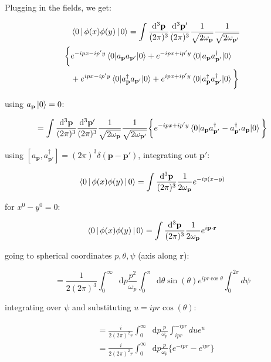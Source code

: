 \documentclass[aspectratio=169]{beamer}
\newcommand{\vp}{\mathbf{p}}
\newcommand{\vr}{\mathbf{r}}
\newcommand{\vpp}{\mathbf{p}'}
\newcommand{\omp}{\omega_{p}}
\newcommand{\omvp}{\omega_{\vp}}
\newcommand{\omvpp}{\omega_{\vpp}}
\newcommand{\ap}{a_{\vp}}
\newcommand{\app}{a_{\vpp}}
\newcommand{\adp}{a^\dagger_{\vp}}
\newcommand{\adpp}{a^\dagger_{\vpp}}
\newcommand{\diffop}{\mathop{}\!\mathrm{d}}
\newcommand{\dip}{\diffop p}
\newcommand{\dtheta}{\diffop \theta}
\newcommand{\bysqrt}[1]{\frac{1}{\sqrt{#1}}}
\newcommand{\intpthree}{\int \frac{\diffop^3\vp}{(2\pi)^3}}
\newcommand{\intpthreeppthree}{\int \frac{\diffop^3\vp}{(2\pi)^3} \frac{\diffop^3\vpp}{(2\pi)^3}}
\newcommand{\com}[2]{[{#1},{#2}]}
\newcommand{\phixy}{\Braket{0|\phi(x)\phi(y)|0}}
\begin{document}
\begin{frame}
Plugging in the fields, we get:

\begin{equation*}
\begin{split}
& \phixy = \intpthreeppthree \bysqrt{2\omvp} \bysqrt{2\omvpp} \\
\bigg\{ & e^{-ipx-ip'y} \braket{0|\ap\app|0} + e^{-ipx+ip'y} \braket{0|\ap\adpp|0} \\
        & + e^{ipx-ip'y} \braket{0|\adp\app|0} + e^{ipx+ip'y} \braket{0|\adp\adpp|0} \bigg\}
\end{split}
\end{equation*}

using $\ap\ket{0} = 0$:

\begin{equation*}
= \intpthreeppthree \bysqrt{2\omvp} \bysqrt{2\omvpp}
\bigg\{ e^{-ipx+ip'y} \braket{0|\ap\adpp - \adpp\ap|0} \bigg\}
\end{equation*}
\end{frame}


\begin{frame}
using $\com{\ap}{\adpp} = (2\pi)^3 \delta(\vp - \vpp)$, integrating out $\vpp$:

\begin{equation*}
\phixy = \intpthree \frac{1}{2\omvp} e^{-ip(x-y)}
\end{equation*}

for $x^0 - y^0 = 0$:

\begin{equation*}
\phixy = \intpthree \frac{1}{2\omvp} e^{i\vp\cdot\vr}
\end{equation*}
\end{frame}


\begin{frame}
going to spherical coordinates $p, \theta, \psi$ (axis along $\vr$):

\begin{equation*}
= \frac{1}{2(2\pi)^3} \int_0^\infty \dip \frac{p^2}{\omp} \int_0^\pi \dtheta \sin(\theta) e^{ipr\cos{\theta}}
\int_0^{2\pi} d\psi
\end{equation*}

integrating over $\psi$ and substituting $u = ipr\cos(\theta)$:

\begin{equation*}
\begin{split}
& = \frac{i}{2(2\pi)^2 r} \int_0^\infty \dip \frac{p}{\omp} \int_{ipr}^{-ipr} du e^{u} \\
& = \frac{i}{2(2\pi)^2 r} \int_0^\infty \dip \frac{p}{\omp} \big\{ e^{-ipr} - e^{ipr} \big\}
\end{split}
\end{equation*}

\end{frame}
\end{document}
